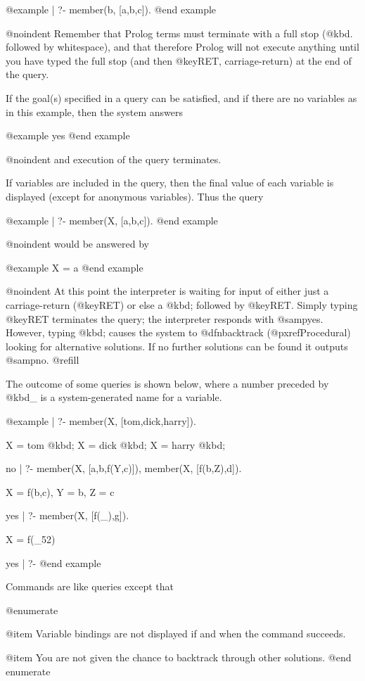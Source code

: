 @example
| ?- member(b, [a,b,c]).
@end example

@noindent
Remember that Prolog terms must terminate with a full stop (@kbd{.}
followed by whitespace), and that therefore Prolog will not execute
anything until you have typed the full stop (and then @key{RET},
carriage-return) at the end of the query.

If the goal(s) specified in a query can be satisfied, and if there are
no variables as in this example, then the system answers

@example
yes
@end example

@noindent
and execution of the query terminates.

If variables are included in the query, then the final value of each
variable is displayed (except for anonymous variables).  Thus the query

@example
| ?- member(X, [a,b,c]).
@end example

@noindent
would be answered by 

@example
X = a
@end example

@noindent
At this point the interpreter is waiting for input of either just a
carriage-return (@key{RET}) or else a @kbd{;} followed by @key{RET}.
Simply typing @key{RET} terminates the query; the interpreter responds
with @samp{yes}.  However, typing @kbd{;} causes the system to
@dfn{backtrack} (@pxref{Procedural}) looking for alternative solutions.
If no further solutions can be found it outputs @samp{no}. @refill

The outcome of some queries is shown below, where a number preceded by
@kbd{_} is a system-generated name for a variable.  

@example
| ?- member(X, [tom,dick,harry]).

X = tom @kbd{;}
X = dick @kbd{;}
X = harry @kbd{;}

no
| ?- member(X, [a,b,f(Y,c)]), member(X, [f(b,Z),d]).

X = f(b,c),
Y = b,
Z = c

yes
| ?- member(X, [f(_),g]).

X = f(_52)

yes
| ?-
@end example

Commands are like queries except that 

@enumerate

@item
Variable bindings are not displayed if and when the command succeeds.

@item
You are not given the chance to backtrack through other solutions.  
@end enumerate

